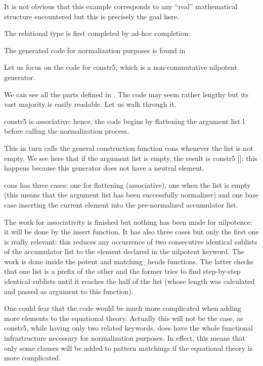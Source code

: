 

It is not obvious that this example corresponds to any ``real'' mathematical
structure encountered but this is precisely the
goal here.

The relational type is first completed by ad-hoc completion:


The generated code for normalization purposes is found in 

Let us focus on the code for {\sf constr5}, which is a non-commutative
nilpotent generator.


We can see all the parts defined in . The code may
seem rather lengthy but its vast majority is easily readable. Let us
walk through it.

{\sf constr5} is associative: hence, the code begins by flattening the
argument list {\sf l} before calling the normalization process.

This in turn calls the general construction function {\sf cons}
whenever the list is not empty. We see here that if the argument list
is empty, the result is {\sf constr5 []}: this happens because this
generator does not have a neutral element.

{\sf cons} has three cases: one for flattening (associative), one when
the list is empty (this means that the argument list has been
successfully normalizer) and one base case inserting the current
element into the pre-normalized accumulator list.

The work for associativity is finished but nothing has been made for
nilpotence: it will be done by the {\sf insert} function. It has also
three cases but only the first one is really relevant: this reduces
any occurrence of two consecutive identical sublists of the
accumulator list to the element declared in the {\sf nilpotent}
keyword. The work is done inside the {\sf potent} and {\sf
  matching\_heads} functions. The latter checks that one list is a
prefix of the other and the former tries to find step-by-step
identical sublists until it reaches the half of the list (whose length
was calculated and passed as argument to this function).

One could fear that the code would be much more complicated when
adding more elements to the equational theory. Actually this will not
be the case, as {\sf constr5}, while having only two related keywords,
does have the whole functional infrastructure necessary for
normalization purposes. In effect, this means that only some clauses
will be added to pattern matchings if the equational theory is more
complicated. 

